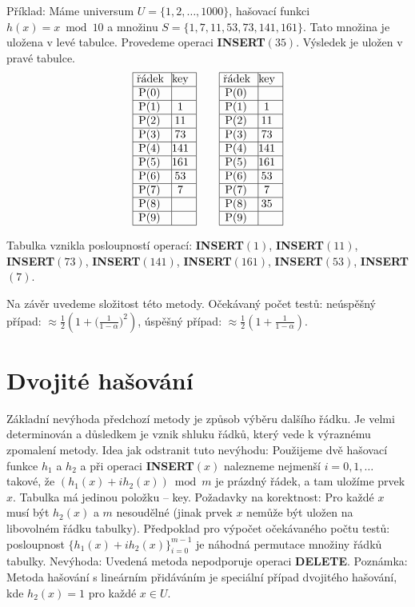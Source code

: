 \documentclass[a4paper,12pt]{article}
\begin{document}
Příklad: Máme universum $U=\{1,2,\dots,1000\}$, 
hašovací funk\-ci $h(x)=x\bmod10$ a množinu  
$S=\{1,7,11,53,73,141,161\}$. Tato množina je uložena v levé tabulce. 
Provedeme operaci {\bf INSERT$(35)$}. Výsledek je uložen v 
pravé tabulce.
$$\vbox {\hbox{\vtop{\offinterlineskip\halign{\strut\vrule\ # & \vrule\hfil# \hfil\vrule\cr\noalign{\hrule}řádek & key \hfil\cr\noalign{\hrule}P(0) & \hfill \cr\noalign{\hrule}P(1) & 1 \cr\noalign{\hrule}P(2) & 11 \cr\noalign{\hrule}P(3) & 73 \cr\noalign{\hrule}P(4) & 141 \cr\noalign{\hrule}P(5) & 161 \cr\noalign{\hrule}P(6) & 53 \cr\noalign{\hrule}P(7) & 7 \cr\noalign{\hrule}P(8) & \hfill\cr\noalign{\hrule}P(9) & \hfill \cr\noalign{\hrule}}}\qquad\vtop{\offinterlineskip\halign {\strut\vrule\ # & \vrule \hfil # \hfil \vrule\cr\noalign{\hrule}řádek & key \hfil \cr\noalign{\hrule}P(0) & \hfill \cr\noalign{\hrule}P(1) & 1 \cr\noalign{\hrule}P(2) & 11 \cr\noalign{\hrule}P(3) & 73 \cr\noalign{\hrule}P(4) & 141 \cr\noalign{\hrule}P(5) & 161 \cr\noalign{\hrule}P(6) & 53 \cr\noalign{\hrule}P(7) & 7 \cr\noalign{\hrule}P(8) & 35  \cr\noalign{\hrule}P(9) & \hfill \cr\noalign{\hrule}}}}}$$

Tabulka vznikla posloupností operací:\newline 
{\bf INSERT$(1)$}, {\bf INSERT$(11)$}, {\bf INSERT$(73)$}, 
{\bf INSERT$(141)$}, {\bf INSERT$(161)$},\newline 
{\bf INSERT$(53)$}, {\bf INSERT$(7)$}. 

Na závěr uvedeme složitost této metody. Očekávaný 
počet testů:\newline 
\phantom{---}neúspěšný případ: $\approx\frac 12(
1+\big(\frac 1{1-\alpha}\big)^2)$, \newline 
\phantom{---}úspěšný případ: $\approx\frac 12(1+\frac 
1{1-\alpha})$.

\section{Dvojité hašování}

Základní nevýhoda předchozí metody je způsob 
výběru dal\-ší\-ho řádku. Je velmi determinován a 
důsledkem je vznik shluku řádků, který 
vede k výraznému zpomalení metody. \newline 
Idea jak odstranit tuto nevýhodu: Použijeme dvě 
hašovací funkce $h_1$ a $h_2$ a při operaci {\bf INSERT$
(x)$ }
nalezneme nejmenší $i=0,1,\dots$ takové, že 
$(h_1(x)+ih_2(x))\bmod m$ je prázdný řádek, a tam uložíme 
prvek $x$.\newline 
Tabulka má jedinou položku -- key.\newline 
Požadavky na korektnost: Pro každé $x$ musí být $h_
2(x)$ a 
$m$ nesoudělné (jinak prvek $x$ nemůže být uložen 
na libovolném řádku tabulky). \newline 
Předpoklad pro výpočet očekávaného počtu testů: posloupnost 
$\{h_1(x)+ih_2(x)\}_{i=0}^{m-1}$ je náhodná permutace množiny 
řádků tabulky.\newline 
Nevýhoda: Uvedená metoda nepodporuje operaci {\bf DELETE}. \newline 
Poznámka: Metoda hašování s lineárním přidáváním je 
speciál\-ní případ dvojitého hašování, kde $
h_2(x)=1$ pro 
každé $x\in U$.
\end{document}
